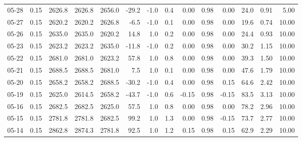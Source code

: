 \begin{threeparttable}
{\begin{tabular}{lrrrrrrrrrrrrr}
  05-28 &     0.15 & 2626.8 & 2626.8 & 2656.0 &      -29.2 &                     -1.0 &                 0.4 &       0.00 &      0.98 &           0.00 &             24.0 &            0.91 &                   5.00 \\
  05-27 &     0.15 & 2620.2 & 2620.2 & 2626.8 &       -6.5 &                     -1.0 &                 0.1 &       0.00 &      0.98 &           0.00 &             19.6 &            0.74 &                  10.00 \\
  05-26 &     0.15 & 2635.0 & 2635.0 & 2620.2 &       14.8 &                      1.0 &                 0.2 &       0.00 &      0.98 &           0.00 &             24.4 &            0.93 &                  10.00 \\
  05-23 &     0.15 & 2623.2 & 2623.2 & 2635.0 &      -11.8 &                     -1.0 &                 0.2 &       0.00 &      0.98 &           0.00 &             30.2 &            1.15 &                  10.00 \\
  05-22 &     0.15 & 2681.0 & 2681.0 & 2623.2 &       57.8 &                      1.0 &                 0.8 &       0.00 &      0.98 &           0.00 &             39.3 &            1.50 &                  10.00 \\
  05-21 &     0.15 & 2688.5 & 2688.5 & 2681.0 &        7.5 &                      1.0 &                 0.1 &       0.00 &      0.98 &           0.00 &             47.6 &            1.79 &                  10.00 \\
  05-20 &     0.15 & 2658.2 & 2658.2 & 2688.5 &      -30.2 &                     -1.0 &                 0.4 &       0.00 &      0.98 &           0.15 &             64.6 &            2.42 &                  10.00 \\
  05-19 &     0.15 & 2625.0 & 2614.5 & 2658.2 &      -43.7 &                     -1.0 &                 0.6 &      -0.15 &      0.98 &          -0.15 &             83.5 &            3.13 &                  10.00 \\
  05-16 &     0.15 & 2682.5 & 2682.5 & 2625.0 &       57.5 &                      1.0 &                 0.8 &       0.00 &      0.98 &           0.00 &             78.2 &            2.96 &                  10.00 \\
  05-15 &     0.15 & 2781.8 & 2781.8 & 2682.5 &       99.2 &                      1.0 &                 1.3 &       0.00 &      0.98 &          -0.15 &             73.7 &            2.77 &                  10.00 \\
  05-14 &     0.15 & 2862.8 & 2874.3 & 2781.8 &       92.5 &                      1.0 &                 1.2 &       0.15 &      0.98 &           0.15 &             62.9 &            2.29 &                  10.00 \\

\end{tabular}}
\end{threeparttable}
